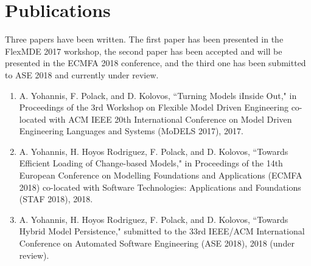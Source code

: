 \documentclass[12pt, a4paper]{report} \usepackage[titletoc]{appendix}
\begin{document}
\chapter{Publications}
\label{ch:publications}
Three papers have been written. The first paper \cite{yohannis2017turning} has been presented in the FlexMDE 2017 workshop, the second paper has been accepted and will be presented in the ECMFA 2018 conference, and the third one has been submitted to ASE 2018 and currently under review.
\begin{enumerate}
\item A. Yohannis, F. Polack, and D. Kolovos, ``Turning Models iInside Out," in Proceedings of the 3rd Workshop on Flexible Model Driven Engineering co-located with ACM IEEE 20th International Conference on Model Driven Engineering Languages and Systems (MoDELS 2017), 2017.
\item  A. Yohannis, H. Hoyos Rodriguez, F. Polack, and D. Kolovos, ``Towards Efficient Loading of Change-based Models," in Proceedings of the 14th European Conference on Modelling Foundations and Applications (ECMFA 2018) co-located with Software Technologies: Applications and Foundations (STAF 2018), 2018.
\item  A. Yohannis, H. Hoyos Rodriguez, F. Polack, and D. Kolovos, ``Towards Hybrid Model Persistence," submitted to the 33rd IEEE/ACM International Conference on Automated Software Engineering (ASE 2018), 2018 (under review).
\end{enumerate}




\end{document}
